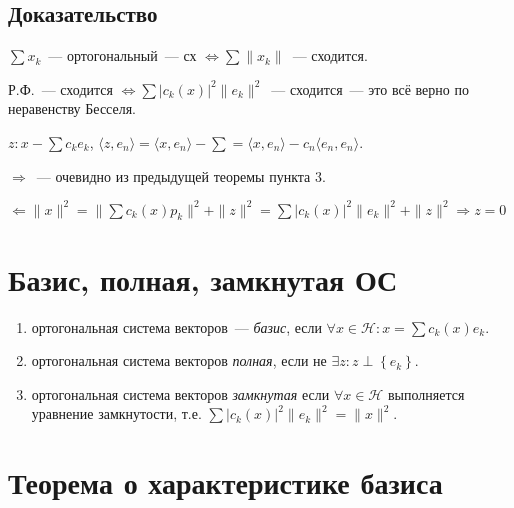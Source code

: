 \documentclass{article}
\begin{document}
        \subsection{Доказательство}
        
            $\sum x_k$~--- ортогональный~--- сх $\Longleftrightarrow \sum \| x_k \|$~--- сходится.
            
            Р.Ф.~--- сходится $\Longleftrightarrow \sum \left| c_k(x) \right|^2 \| e_k \|^2$~--- сходится~--- это всё верно по неравенству Бесселя.
            
            $z : x - \sum c_k e_k$, $\langle z, e_n \rangle = \langle x, e_n \rangle - \sum = \langle x, e_n \rangle - c_n \langle e_n, e_n \rangle$.
            
            $\Rightarrow$~--- очевидно из предыдущей теоремы пункта $3$.
            
            $\Leftarrow \| x \|^2 = \| \sum c_k(x) p_k \|^2 + \| z \|^2 = \sum \left| c_k(x) \right|^2 \| e_k \|^2 + \| z \|^2 \Rightarrow z = 0$
            
    \newpage
    
    \section{Базис, полная, замкнутая ОС}
    
        \begin{enumerate}
        
            \item ортогональная система векторов~--- \textit{базис}, если $\forall x \in \mathcal{H} : x = \sum c_k(x) e_k$.
            
            \item ортогональная система векторов \textit{полная}, если не $\exists z : z \perp \left\{ e_k \right\}$.
            
            \item ортогональная система векторов \textit{замкнутая} если $\forall x \in \mathcal{H}$ выполняется уравнение замкнутости, т.е. $\sum \left| c_k(x) \right|^2 \| e_k \|^2 = \| x \|^2$.
            
        \end{enumerate}
            
    \newpage
    
    \section{Теорема о характеристике базиса}
    
\end{document}
